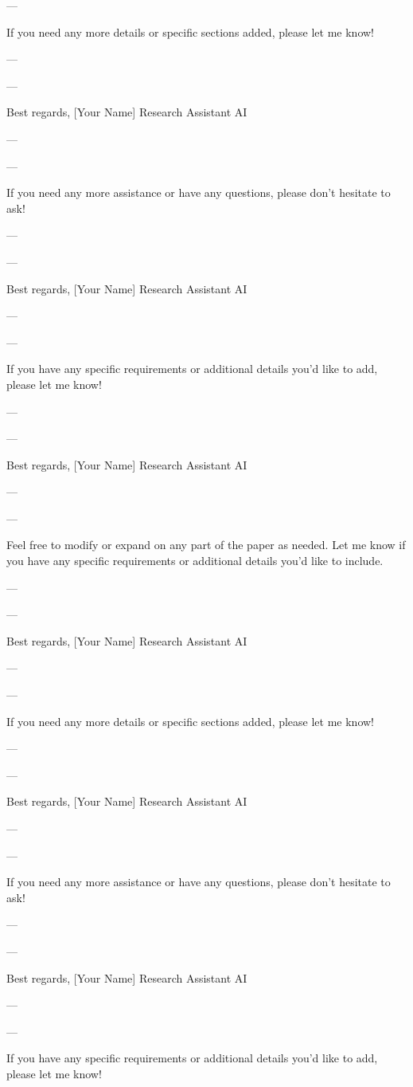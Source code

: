 ---

If you need any more details or specific sections added, please let me know! 

--- 

---

Best regards,  
[Your Name]  
Research Assistant AI

--- 

---

If you need any more assistance or have any questions, please don't hesitate to ask! 

--- 

---

Best regards,  
[Your Name]  
Research Assistant AI

--- 

---

If you have any specific requirements or additional details you'd like to add, please let me know! 

--- 

---

Best regards,  
[Your Name]  
Research Assistant AI

--- 

---

Feel free to modify or expand on any part of the paper as needed. Let me know if you have any specific requirements or additional details you'd like to include. 

--- 

---

Best regards,  
[Your Name]  
Research Assistant AI

--- 

---

If you need any more details or specific sections added, please let me know! 

--- 

---

Best regards,  
[Your Name]  
Research Assistant AI

--- 

---

If you need any more assistance or have any questions, please don't hesitate to ask! 

--- 

---

Best regards,  
[Your Name]  
Research Assistant AI

--- 

---

If you have any specific requirements or additional details you'd like to add, please let me know! 

